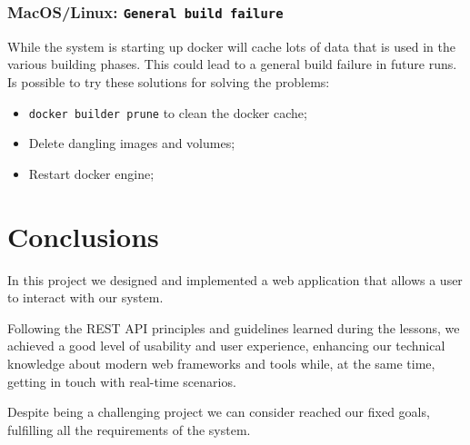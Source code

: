 \documentclass{scrartcl}
\begin{document}
\subsubsection*{MacOS/Linux: \texttt{General build failure}}
While the system is starting up docker will cache lots of data that is used in the various building phases. This could lead to a general build failure in future runs. Is possible to try these solutions for solving the problems:
\begin{itemize}
    \item \texttt{docker builder prune} to clean the docker cache;
    \item Delete dangling images and volumes;
    \item Restart docker engine;
\end{itemize}

\section{Conclusions}

In this project we designed and implemented a web application that allows a user to interact with our system.

Following the REST API principles and guidelines learned during the lessons, we achieved a good level of usability and user experience, enhancing our technical knowledge about modern web frameworks and tools while, at the same time, getting in touch with real-time scenarios.

Despite being a challenging project we can consider reached our fixed goals, fulfilling all the requirements of the system.


\nocite{*} %


\end{document}
